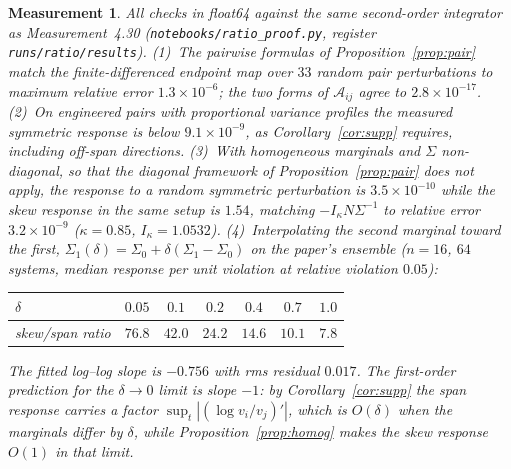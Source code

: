 \documentclass[11pt]{article}
\newtheorem{measurement}{Measurement}
\theoremstyle{remark}
\begin{document}
\begin{measurement}\label{meas:ratio}
All checks in float64 against the same second-order integrator as Measurement~4.30
(\texttt{notebooks/ratio\_proof.py}, register \texttt{runs/ratio/results}).
(1)~The pairwise formulas of Proposition~\ref{prop:pair} match the finite-differenced endpoint
map over $33$ random pair perturbations to maximum relative error $1.3\times10^{-6}$; the two
forms of $\mathcal A_{ij}$ agree to $2.8\times10^{-17}$. (2)~On engineered pairs with
proportional variance profiles the measured symmetric response is below $9.1\times10^{-9}$, as
Corollary~\ref{cor:supp} requires, including off-span directions. (3)~With homogeneous marginals
and $\Sigma$ non-diagonal, so that the diagonal framework of Proposition~\ref{prop:pair} does not
apply, the response to a random symmetric perturbation is $3.5\times10^{-10}$
while the skew response in the same setup is $1.54$, matching
$-I_\kappa N\Sigma^{-1}$ to relative error $3.2\times10^{-9}$ ($\kappa=0.85$,
$I_\kappa=1.0532$). (4)~Interpolating the second marginal toward the first,
$\Sigma_1(\delta)=\Sigma_0+\delta(\Sigma_1-\Sigma_0)$ on the paper's ensemble ($n=16$, $64$
systems, median response per unit violation at relative violation $0.05$):
\begin{center}
\begin{tabular}{@{}lcccccc@{}}
\toprule
$\delta$ & $0.05$ & $0.1$ & $0.2$ & $0.4$ & $0.7$ & $1.0$\\
\midrule
skew/span ratio & $76.8$ & $42.0$ & $24.2$ & $14.6$ & $10.1$ & $7.8$\\
\bottomrule
\end{tabular}
\end{center}
The fitted log--log slope is $-0.756$ with rms residual $0.017$. The first-order prediction for
the $\delta\to0$ limit is slope $-1$: by Corollary~\ref{cor:supp} the span response carries a
factor $\sup_t|(\log v_i/v_j)'|$, which is $O(\delta)$ when the marginals differ by $\delta$,
while Proposition~\ref{prop:homog} makes the skew response $O(1)$ in that limit.


\end{measurement}
\end{document}
